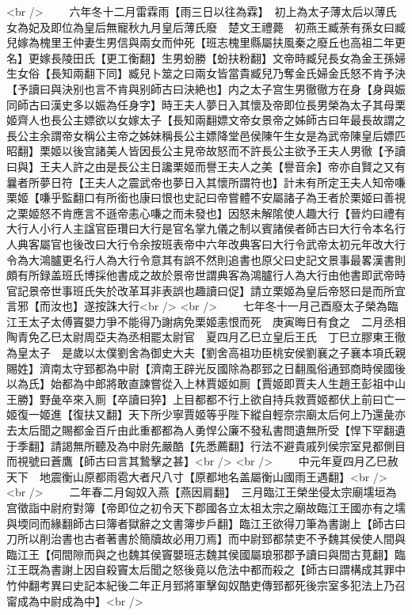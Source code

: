 <br />
　　六年冬十二月雷霖雨【雨三日以往為霖】　初上為太子薄太后以薄氏女為妃及即位為皇后無寵秋九月皇后薄氏廢　楚文王禮薨　初燕王臧荼有孫女曰臧兒嫁為槐里王仲妻生男信與兩女而仲死【班志槐里縣屬扶風秦之廢丘也高祖二年更名】更嫁長陵田氏【更工衡翻】生男蚡勝【蚡扶粉翻】文帝時臧兒長女為金王孫婦生女俗【長知兩翻下同】臧兒卜筮之曰兩女皆當貴臧兒乃奪金氏婦金氏怒不肯予決【予讀曰與決别也言不肯與别師古曰決絶也】内之太子宫生男徹徹方在身【身與娠同師古曰漢史多以娠為任身字】時王夫人夢日入其懷及帝即位長男榮為太子其母栗姬齊人也長公主嫖欲以女嫁太子【長知兩翻嫖文帝女景帝之姊師古曰年最長故謂之長公主余謂帝女稱公主帝之姊妹稱長公主嫖降堂邑侯陳午生女是為武帝陳皇后嫖匹昭翻】栗姬以後宫諸美人皆因長公主見帝故怒而不許長公主欲予王夫人男徹【予讀曰與】王夫人許之由是長公主日讒栗姬而譽王夫人之美【譽音余】帝亦自賢之又有曩者所夢日符【王夫人之震武帝也夢日入其懷所謂符也】計未有所定王夫人知帝嗛栗姬【嗛乎監翻口有所銜也康曰恨也史記曰帝嘗體不安屬諸子為王者於栗姬曰善視之栗姬怒不肯應言不遜帝恚心嗛之而未發也】因怒未解隂使人趣大行【晉灼曰禮有大行人小行人主諡官臣瓚曰大行是官名掌九儀之制以賓諸侯者師古曰大行令本名行人典客屬官也後改曰大行令余按班表帝中六年改典客曰大行令武帝太初元年改大行令為大鴻臚更名行人為大行令意其有誤不然則追書也原父曰史記文景事最畧漢書則頗有所録盖班氏博採他書成之故於景帝世謂典客為鴻臚行人為大行由他書即武帝時官記景帝世事班氏失於改革耳非表誤也趣讀曰促】請立栗姬為皇后帝怒曰是而所宜言邪【而汝也】遂按誅大行<br />
<br />
　　七年冬十一月己酉廢太子榮為臨江王太子太傅竇嬰力爭不能得乃謝病免栗姬恚恨而死　庚寅晦日有食之　二月丞相陶青免乙巳太尉周亞夫為丞相罷太尉官　夏四月乙巳立皇后王氏　丁巳立膠東王徹為皇太子　是歲以太僕劉舍為御史大夫【劉舍高祖功臣桃安侯劉襄之子襄本項氏親賜姓】濟南太守郅都為中尉【濟南王辟光反國除為郡郅之日翻風俗通郅商時侯國後以為氏】始都為中郎將敢直諫嘗從入上林賈姬如厠【賈姬即賈夫人生趙王彭祖中山王勝】野彘卒來入厠【卒讀曰猝】上目都都不行上欲自持兵救賈姬都伏上前曰亡一姬復一姬進【復扶又翻】天下所少寧賈姬等乎陛下縱自輕奈宗廟太后何上乃還彘亦去太后聞之賜都金百斤由此重都都為人勇悍公廉不發私書問遺無所受【悍下罕翻遺于季翻】請謁無所聽及為中尉先嚴酷【先悉薦翻】行法不避貴戚列侯宗室見都側目而視號曰蒼鷹【師古曰言其鷙擊之甚】<br />
<br />
　　中元年夏四月乙巳赦天下　地震衡山原都雨雹大者尺八寸【原都地名盖屬衡山國雨王遇翻】<br />
<br />
　　二年春二月匈奴入燕【燕因肩翻】　三月臨江王榮坐侵太宗廟壖垣為宫徵詣中尉府對簿【帝即位之初令天下郡國各立太祖太宗之廟故臨江王國亦有之壖與堧同而緣翻師古曰簿者獄辭之文書簿步戶翻】臨江王欲得刀筆為書謝上【師古曰刀所以削治書也古者著書於簡牘故必用刀焉】而中尉郅都禁吏不予魏其侯使人間與臨江王【伺間隙而與之也魏其侯竇嬰班志魏其侯國屬琅邪郡予讀曰與間古莧翻】臨江王既為書謝上因自殺竇太后聞之怒後竟以危法中都而殺之【師古曰謂構成其罪中竹仲翻考異曰史記本紀後二年正月郅將軍擊匈奴酷吏傳郅都死後宗室多犯法上乃召甯成為中尉成為中】<br />
